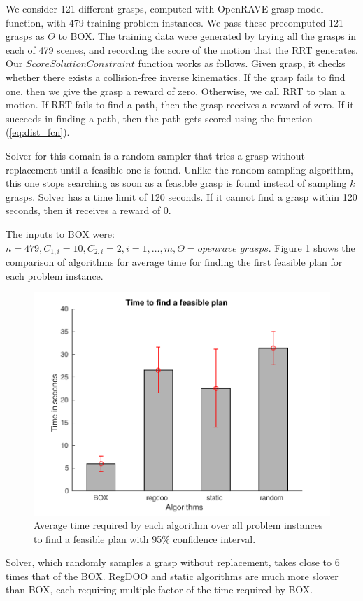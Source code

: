 We consider 121 different grasps, computed with OpenRAVE
grasp model function, with 479 training problem instances. 
We pass these precomputed 121 grasps as $\Theta$ to BOX.
The training data were generated by trying all the grasps
in each of 479 scenes, and recording the score of the
motion that the RRT generates. Our $ScoreSolutionConstraint$ 
function works as follows. Given grasp, 
it checks whether there exists a collision-free inverse kinematics. 
If the grasp fails to find one, then we give the grasp
a reward of zero. Otherwise, 
we call RRT to plan a motion. If RRT fails 
to find a path, then the grasp receives a reward of zero.
If it succeeds in finding a path,
then the path gets scored using the function (\ref{eq:dist_fcn}).


Solver for this domain is a random sampler that 
tries a grasp without replacement until a feasible one is found. Unlike
the random sampling algorithm, this one stops searching as soon as
a feasible grasp is found instead of sampling $k$ grasps. Solver 
has a time limit of 120 seconds. If it cannot find a grasp within 120 seconds,
then it receives a reward of 0.

The inputs to BOX were: 
$n=479,C_{1,i}=10,C_{2,i}=2, i=1,\ldots,m,\Theta=openrave\_grasps$.  
Figure \ref{fig:ff_bar_grasp} shows the comparison of algorithms
for average time for finding the first feasible plan for each problem instance.
\begin{figure}[htb]
\centering
\includegraphics[scale=0.5]{./figures/only_grasp_feas_plot.pdf}
\caption{ Average time required by each algorithm over all problem instances to 
find a feasible plan with 95\% confidence interval.}
\label{fig:ff_bar_grasp}
\end{figure} 
Solver, which randomly samples a grasp without replacement, takes
close to 6 times that of the BOX. RegDOO and static algorithms
are much more slower than BOX, each requiring multiple factor 
of the time required by BOX.



